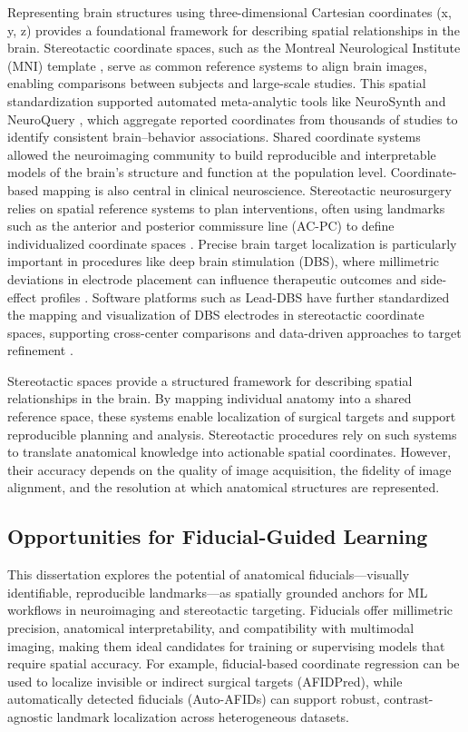 Representing brain structures using three-dimensional Cartesian coordinates (x, y, z) provides a foundational framework for describing spatial relationships in the brain. Stereotactic coordinate spaces, such as the Montreal Neurological Institute (MNI) template \cite{Avants2008-ek,Fonov2009-oi}, serve as common reference systems to align brain images, enabling comparisons between subjects and large-scale studies. This spatial standardization supported automated meta-analytic tools like NeuroSynth \cite{Yarkoni2011-sr} and NeuroQuery \cite{Dockes2020-nw}, which aggregate reported coordinates from thousands of studies to identify consistent brain–behavior associations. Shared coordinate systems allowed the neuroimaging community to build reproducible and interpretable models of the brain's structure and function at the population level.
Coordinate-based mapping is also central in clinical neuroscience. Stereotactic neurosurgery relies on spatial reference systems to plan interventions, often using landmarks such as the anterior and posterior commissure line (AC-PC) to define individualized coordinate spaces \cite{Talalrach1957-bs}. Precise brain target localization is particularly important in procedures like deep brain stimulation (DBS), where millimetric deviations in electrode placement can influence therapeutic outcomes and side-effect profiles \cite{Horn2018-qq}. Software platforms such as Lead-DBS \cite{Neudorfer2023-wd} have further standardized the mapping and visualization of DBS electrodes in stereotactic coordinate spaces, supporting cross-center comparisons and data-driven approaches to target refinement \cite{Ewert2018-bn}.


Stereotactic spaces provide a structured framework for describing spatial relationships in the brain. By mapping individual anatomy into a shared reference space, these systems enable localization of surgical targets and support reproducible planning and analysis. Stereotactic procedures rely on such systems to translate anatomical knowledge into actionable spatial coordinates. However, their accuracy depends on the quality of image acquisition, the fidelity of image alignment, and the resolution at which anatomical structures are represented.


\subsection{Opportunities for Fiducial-Guided Learning}

This dissertation explores the potential of anatomical fiducials—visually identifiable, reproducible landmarks—as spatially grounded anchors for ML workflows in neuroimaging and stereotactic targeting. Fiducials offer millimetric precision, anatomical interpretability, and compatibility with multimodal imaging, making them ideal candidates for training or supervising models that require spatial accuracy. For example, fiducial-based coordinate regression can be used to localize invisible or indirect surgical targets (AFIDPred), while automatically detected fiducials (Auto-AFIDs) can support robust, contrast-agnostic landmark localization across heterogeneous datasets.

